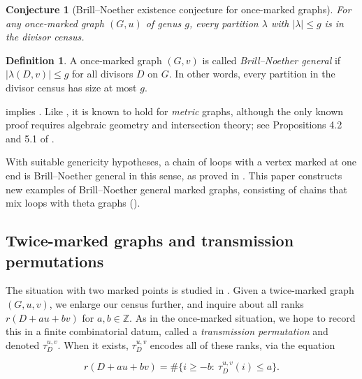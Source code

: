 \documentclass[11pt]{article}
\newtheorem{conjecture}[theo]{Conjecture}
\theoremstyle{definition}
\newtheorem{defi}[theo]{Definition}
\numberwithin{equation}{section}
\newcommand{\Z}{\mathbb{Z}}
\newcommand{\tauD}{\tau^{u,v}_D}
\begin{document}
\begin{conjecture}[Brill--Noether existence conjecture for once-marked graphs]\label{conj:bnOnceMarked}
For \emph{any} once-marked graph $(G,u)$ of genus $g$, every partition $\lambda$ with $|\lambda| \leq g$ is in the divisor census. 
\end{conjecture}

\begin{defi}
A once-marked graph $(G,v)$ is called \emph{Brill--Noether general} if $|\lambda(D,v)| \leq g$ for all divisors $D$ on $G$. In other words, every partition in the divisor census has size at most $g$.
\end{defi}

 implies . Like , it is known to hold for \emph{metric} graphs, although the only known proof requires algebraic geometry and intersection theory; see Propositions 4.2 and 5.1 of \cite{Pfl17}.

With suitable genericity hypotheses, a chain of loops with a vertex marked at one end is Brill--Noether general in this sense, as proved in \cite{Pfl17}. This paper constructs new examples of Brill--Noether general marked graphs, consisting of chains that mix loops with theta graphs ().


\subsection{Twice-marked graphs and transmission permutations}

The situation with two marked points is studied in \cite{Pfl22}. Given a twice-marked graph $(G,u,v)$, we enlarge our census further, and inquire about all ranks $r(D+au+bv)$ for $a,b \in \Z$. As in the once-marked situation, we hope to record this in a finite combinatorial datum, called a \emph{transmission permutation} and denoted $\tauD$. When it exists, $\tauD$ encodes all of these ranks, via the equation

\begin{equation}\label{eq-tauDIntroDefn}
    r(D + au + bv) = \# \{ i \geq -b:\ \tauD(i) \leq a \}.
\end{equation}
\end{document}

